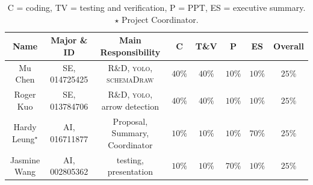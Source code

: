 \documentclass[10pt]{article}
\begin{document}
\begin{table}[htbp]
\centering
\begin{tabular}{|c|c|c|c|c|c|c|c|}
\hline
Name & Major \& ID & Main Responsibility & \textsc{C} &
	\textsc{T\&V} & \textsc{P} & \textsc{ES} & Overall \\
\hline
Mu Chen & SE, 014725425 & R\&D, \textsc{yolo}, \textsc{schemaDraw} & $40\%$ & $40\%$ & $10\%$ & $10\%$ & $25\%$ \\
Roger Kuo & SE, 013784706 & R\&D, \textsc{yolo}, arrow detection & $40\%$ & $40\%$ & $10\%$ & $10\%$ & $25\%$ \\
Hardy Leung${}^\star$ & AI, 016711877 &
Proposal, Summary, Coordinator & $10\%$ & $10\%$ & $10\%$ & $70\%$ & $25\%$ \\
Jasmine Wang & AI, 002805362 & testing, presentation & $10\%$ & $10\%$ & $70\%$ & $10\%$ & $25\%$ \\ \hline
\end{tabular}
\caption{\textsc{C} = coding, \textsc{TV} =
testing and verification,
\textsc{P} = PPT, \textsc{ES} = executive summary. $\star$ Project Coordinator.
}
\end{table}

% 
% 
\end{document}
